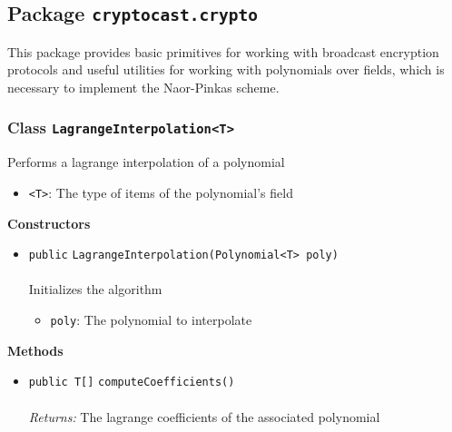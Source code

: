 \subsection{Package \lstinline!cryptocast.crypto!}
This package provides basic primitives for working with broadcast encryption protocols
 and useful utilities for working with polynomials over fields, which is necessary to implement
 the Naor-Pinkas scheme.
\subsubsection{Class \lstinline|LagrangeInterpolation<T>|}
Performs a lagrange interpolation of a polynomial \\
\noindent\begin{minipage}[t]{5cm}
\vspace{0.3em}
\hspace*{2em}
\vspace{0.3em}
\end{minipage}

\begin{itemize}
\item \lstinline|<T>|: The type of items of the polynomial's field
\end{itemize}



\textbf{\sffamily Constructors}
\begin{itemize}
\item \lstinline|public| \lstinline|LagrangeInterpolation|\lstinline|(Polynomial<T> poly)|\\ \\[-0.6em]
Initializes the algorithm
\begin{itemize}
\item \lstinline|poly|: The polynomial to interpolate
\end{itemize}



\end{itemize}


\textbf{\sffamily Methods}
\begin{itemize}
\item \lstinline|public T[]| \lstinline|computeCoefficients|\lstinline|()|\\ \\[-0.6em]
\emph{Returns:} The lagrange coefficients of the associated polynomial



\end{itemize}

